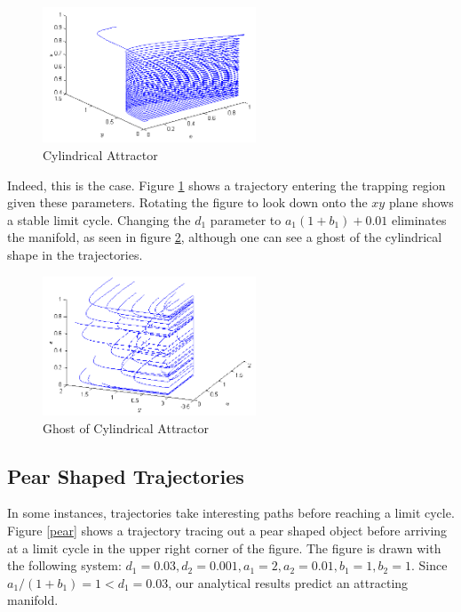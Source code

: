 \documentclass[12pt,journal,compsoc,twoside]{IEEEtran}
\begin{document}
\begin{figure}[h]
\centering
\includegraphics[width=2.5in, trim = 10 20 10 20]{attractor.png}
\caption{Cylindrical Attractor}
\label{attractor}
\end{figure}

Indeed, this is the case. Figure \ref{attractor} shows a trajectory entering the trapping region given these parameters. Rotating the figure to look down onto the $xy$ plane shows a stable limit cycle. Changing the $d_1$ parameter to $a_1 ( 1 + b_1) + 0.01$ eliminates the manifold, as seen in figure \ref{noattractor}, although one can see a ghost of the cylindrical shape in the trajectories.

\begin{figure}[h!]
\centering
\includegraphics[width=2.5in, trim = 10 20 10 20]{noattractor.png}
\caption{Ghost of Cylindrical Attractor}
\label{noattractor}
\end{figure}

\subsection{Pear Shaped Trajectories}
\label{sec:pear}

In some instances, trajectories take interesting paths before reaching a limit cycle. Figure \ref{pear} shows a trajectory tracing out a pear shaped object before arriving at a limit cycle in the upper right corner of the figure. The figure is drawn with the following system: $d_1 = 0.03, d_2 = 0.001, a_1 = 2, a_2 = 0.01, b_1 = 1, b_2 = 1$. Since $a_1 / (1 + b_1) = 1 < d_1 = 0.03$, our analytical results predict an attracting manifold. 
\end{document}
